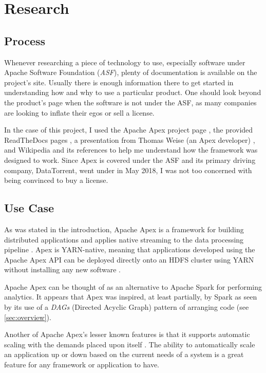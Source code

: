 \documentclass[final]{IEEEtran}
\begin{document}
\section{Research}
\subsection{Process}
Whenever researching a piece of technology to use, especially software under Apache Software Foundation (\emph{ASF}), plenty of documentation is available on the project's site. Usually there is enough information there to get started in understanding how and why to use a particular product. One should look beyond the product's page when the software is not under the ASF, as many companies are looking to inflate their egos or sell a license.

In the case of this project, I used the Apache Apex project page \cite{APEX}, the provided ReadTheDocs pages\cite{APEXrtd_dt} \cite{APEX-DOCS} \cite{MALHAR-DOCS}, a presentation from Thomas Weise (an Apex developer) \cite{WEISE}, and Wikipedia and its references \cite{WIKI} \cite{DATANAMI} to help me understand how the framework was designed to work. Since Apex is covered under the ASF and its primary driving company, DataTorrent, went under in May 2018, I was not too concerned with being convinced to buy a license.

\subsection{Use Case}
As was stated in the introduction, Apache Apex is a framework for building distributed applications and applies native streaming to the data processing pipeline \cite{WEISE}. Apex is YARN-native, meaning that applications developed using the Apache Apex API can be deployed directly onto an HDFS cluster using YARN without installing any new software \cite{WEISE2}.

Apache Apex can be thought of as an alternative to Apache Spark for performing analytics. It appears that Apex was inspired, at least partially, by Spark as seen by its use of a \emph{DAGs} (Directed Acyclic Graph) pattern of arranging code (see \ref{sec:overview}).

Another of Apache Apex's lesser known features is that it supports automatic scaling with the demands placed upon itself \cite{WEISE2}. The ability to automatically scale an application up or down based on the current needs of a system is a great feature for any framework or application to have.
\end{document}

